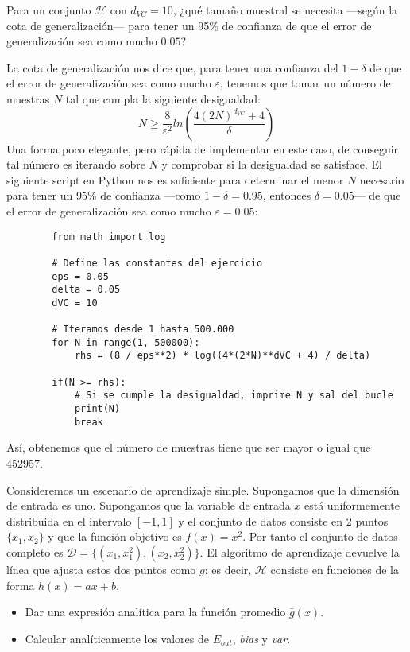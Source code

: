 \documentclass[a4paper, 11pt]{article}
\begin{document}
    \begin{ejercicio}
        Para un conjunto $\mathcal{H}$ con $d_{VC} = 10$, ¿qué tamaño muestral se necesita ---según la cota de generalización--- para tener un 95\% de confianza de que el error de generalización sea como mucho $0.05$?
    \end{ejercicio}

    \begin{solucion}
        La cota de generalización nos dice que, para tener una confianza del $1-\delta$ de que el error de generalización sea como mucho $\varepsilon$, tenemos que tomar un número de muestras $N$ tal que cumpla la siguiente desigualdad:
        \[
        N \geq \frac{8}{\varepsilon^2} ln(\frac{4 (2N)^{d_{VC}} + 4}{\delta})
        \]
        Una forma poco elegante, pero rápida de implementar en este caso, de conseguir tal número es iterando sobre $N$ y comprobar si la desigualdad se satisface. El siguiente script en Python nos es suficiente para determinar el menor $N$ necesario para tener un 95\% de confianza ---como $1-\delta = 0.95$, entonces $\delta = 0.05$--- de que el error de generalización sea como mucho $\varepsilon = 0.05$:

        \begin{lstlisting}
        from math import log

        # Define las constantes del ejercicio
        eps = 0.05
        delta = 0.05
        dVC = 10

        # Iteramos desde 1 hasta 500.000
        for N in range(1, 500000):
            rhs = (8 / eps**2) * log((4*(2*N)**dVC + 4) / delta)

        if(N >= rhs):
            # Si se cumple la desigualdad, imprime N y sal del bucle
            print(N)
            break
        \end{lstlisting}

        Así, obtenemos que el número de muestras tiene que ser mayor o igual que 452957.
    \end{solucion}

    \begin{ejercicio}
        Consideremos un escenario de aprendizaje simple. Supongamos que la dimensión de entrada es uno. Supongamos que la variable de entrada $x$ está uniformemente distribuida en el intervalo $[-1, 1]$ y el conjunto de datos consiste en 2 puntos $\{x_1, x_2\}$ y que la función objetivo es $f(x) = x^2$. Por tanto el conjunto de datos completo es $\mathcal{D} = \{(x_1 , x_1^2), (x_2, x_2^2)\}$. El algoritmo de aprendizaje devuelve la línea que ajusta estos dos puntos como $g$; es decir, $\mathcal{H}$ consiste en funciones de la forma $h(x) = ax + b$.
        \begin{itemize}
            \item Dar una expresión analítica para la función promedio $\bar{g}(x)$.
            \item Calcular analíticamente los valores de $E_{out}$, \emph{bias} y \emph{var}.
        \end{itemize}
    \end{ejercicio}
\end{document}
